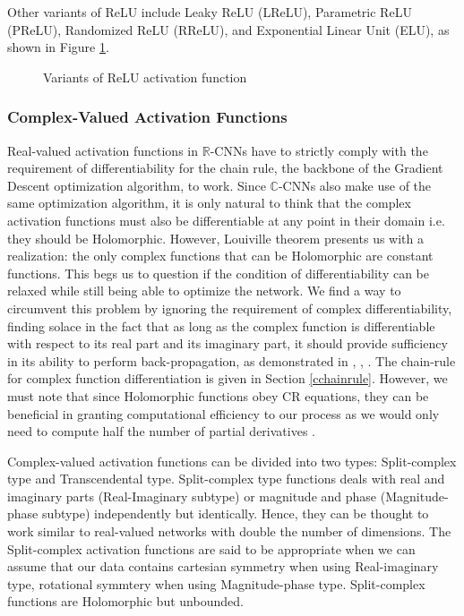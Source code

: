  
 Other variants of ReLU include Leaky ReLU (LReLU), Parametric ReLU (PReLU), Randomized ReLU (RReLU), and Exponential Linear Unit (ELU), as shown in Figure \ref{ractfn}. 
  
 
  \begin{figure}[htb]
 	\centering
 	\epsfxsize=14cm
 	{}
 	\caption{Variants of ReLU activation function}
 	\label{ractfn}
 \end{figure}
  
  
  
 \subsubsection{Complex-Valued Activation Functions}\label{cvaf}
 
 Real-valued activation functions in $\mathbb{R}$-CNNs have to strictly comply with the requirement of differentiability for the chain rule, the backbone of the Gradient Descent optimization algorithm, to work. Since $\mathbb{C}$-CNNs also make use of the 
 same optimization algorithm, it is only natural to think that the complex activation functions must also be differentiable at any point in their domain i.e. they should be Holomorphic. However, Louiville theorem presents us with a realization: the only complex functions that can be  Holomorphic are constant functions. This begs us to question if the condition of differentiability can be relaxed while still being able to optimize the network.
 We find a way to circumvent this problem by ignoring the requirement of complex differentiability, finding solace in the fact that as long as the complex function is differentiable with respect to its real part and its imaginary part, it should provide sufficiency in its ability to perform back-propagation, as demonstrated in \cite{trabelsi2018deep}, \cite{hansch2010complex}, \cite{polsarzhang2017complex}. The chain-rule for complex function differentiation is given in Section \ref{cchainrule}. However, we must note that since Holomorphic functions obey CR equations, they can be  beneficial in granting computational efficiency to our process as we would only need to compute half the number of partial derivatives \cite{sarroff2015learning}.
 
     
 Complex-valued activation functions can be divided into two types: Split-complex type and Transcendental type.
 Split-complex type functions deals with real and imaginary parts (Real-Imaginary subtype) or magnitude and phase (Magnitude-phase subtype) independently but identically. Hence, they can be thought to work similar to real-valued networks with double the number of dimensions. The Split-complex activation functions are said to be appropriate when we can assume that our data contains cartesian symmetry when using Real-imaginary type, rotational symmtery when using Magnitude-phase type. Split-complex functions are Holomorphic but unbounded.
 
